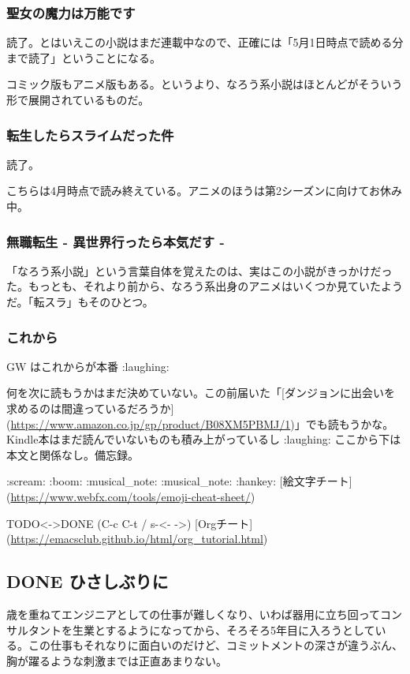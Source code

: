 \documentclass[11pt]{article}
\begin{document}
\subsubsection{聖女の魔力は万能です}
\label{sec:org1d8b9c5}
読了。とはいえこの小説はまだ連載中なので、正確には「5月1日時点で読める分まで読了」ということになる。

コミック版もアニメ版もある。というより、なろう系小説はほとんどがそういう形で展開されているものだ。
\subsubsection{転生したらスライムだった件}
\label{sec:org62b67b0}
読了。

こちらは4月時点で読み終えている。アニメのほうは第2シーズンに向けてお休み中。
\subsubsection{無職転生 - 異世界行ったら本気だす -}
\label{sec:orgd3ba1fc}
「なろう系小説」という言葉自体を覚えたのは、実はこの小説がきっかけだった。もっとも、それより前から、なろう系出身のアニメはいくつか見ていたようだ。「転スラ」もそのひとつ。
\subsubsection{これから}
\label{sec:org8851111}
GW はこれからが本番 :laughing:

何を次に読もうかはまだ決めていない。この前届いた「[ダンジョンに出会いを求めるのは間違っているだろうか](\url{https://www.amazon.co.jp/gp/product/B08XM5PBMJ/1})」でも読もうかな。Kindle本はまだ読んでいないものも積み上がっているし :laughing:
ここから下は本文と関係なし。備忘録。

:scream: :boom: :musical\_note: :musical\_note: :hankey:
{[}絵文字チート](\url{https://www.webfx.com/tools/emoji-cheat-sheet/})

TODO<->DONE (C-c C-t / s-<- ->)
{[}Orgチート](\url{https://emacsclub.github.io/html/org\_tutorial.html})
\subsection{{\bfseries\sffamily DONE} ひさしぶりに}
\label{sec:org2a3a64a}
歳を重ねてエンジニアとしての仕事が難しくなり、いわば器用に立ち回ってコンサルタントを生業とするようになってから、そろそろ5年目に入ろうとしている。この仕事もそれなりに面白いのだけど、コミットメントの深さが違うぶん、胸が躍るような刺激までは正直あまりない。
\end{document}
